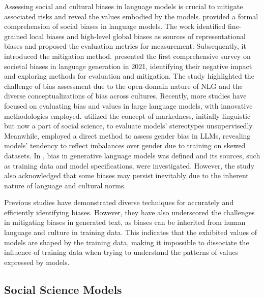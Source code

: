 \documentclass[11pt]{article}
\begin{document}
Assessing social and cultural biases in language models is crucial to mitigate associated risks and reveal the values embodied by the models. \citet{pmlr-v139-liang21a} provided a formal comprehension of social biases in language models. The work identified fine-grained local biases and high-level global biases as sources of representational biases and proposed the evaluation metrics for measurement. Subsequently, it introduced the mitigation method. \citet{sheng2021societal} presented the first comprehensive survey on societal biases in language generation in 2021, identifying their negative impact and exploring methods for evaluation and mitigation. The study highlighted the challenge of bias assessment due to the open-domain nature of NLG and the diverse conceptualizations of bias across cultures. Recently, more studies have focused on evaluating bias and values in large language models, with innovative methodologies employed. \citet{cheng2023marked} utilized the concept of markedness, initially linguistic but now a part of social science, to evaluate models' stereotypes unsupervisedly. Meanwhile, \citet{10.1145/3582269.3615599} employed a direct method to assess gender bias in LLMs, revealing models' tendency to reflect imbalances over gender due to training on skewed datasets. In \citet{Ferrara_2023}, bias in generative language models was defined and its sources, such as training data and model specifications, were investigated. However, the study also acknowledged that some biases may persist inevitably due to the inherent nature of language and cultural norms.

Previous studies have demonstrated diverse techniques for accurately and efficiently identifying biases. However, they have also underscored the challenges in mitigating biases in generated text, as biases can be inherited from human language and culture in training data. This indicates that the exhibited values of models are shaped by the training data, making it impossible to dissociate the influence of training data when trying to understand the patterns of values expressed by models.

\subsection{Social Science Models}
\end{document}
